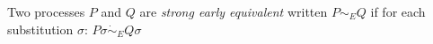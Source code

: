 \begin{definition}
  Two processes $P$ and $Q$ are \emph{strong early equivalent} written $P\sim_{E}Q$ if for each substitution $\sigma$: $P\sigma \dot{\sim}_{E}Q\sigma$
\end{definition}
% 
